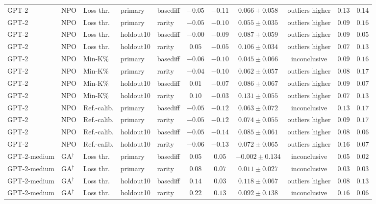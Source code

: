 \begin{table}[t]
\begin{tabular*}{\textwidth}{@{\extracolsep{\fill}}lllllcccccc@{}}
GPT-2 & NPO & Loss thr. & primary & basediff & $-0.05$ & $-0.11$ & $0.066 \pm 0.058$ & outliers higher & $0.13$ & $0.14$ \\
GPT-2 & NPO & Loss thr. & primary & rarity & $-0.05$ & $-0.10$ & $0.055 \pm 0.035$ & outliers higher & $0.09$ & $0.16$ \\
GPT-2 & NPO & Loss thr. & holdout10 & basediff & $-0.00$ & $-0.09$ & $0.087 \pm 0.059$ & outliers higher & $0.09$ & $0.05$ \\
GPT-2 & NPO & Loss thr. & holdout10 & rarity & $0.05$ & $-0.05$ & $0.106 \pm 0.034$ & outliers higher & $0.07$ & $0.13$ \\
GPT-2 & NPO & Min-K\% & primary & basediff & $-0.06$ & $-0.10$ & $0.045 \pm 0.066$ & inconclusive & $0.09$ & $0.16$ \\
GPT-2 & NPO & Min-K\% & primary & rarity & $-0.04$ & $-0.10$ & $0.062 \pm 0.057$ & outliers higher & $0.08$ & $0.17$ \\
GPT-2 & NPO & Min-K\% & holdout10 & basediff & $0.01$ & $-0.07$ & $0.086 \pm 0.067$ & outliers higher & $0.09$ & $0.07$ \\
GPT-2 & NPO & Min-K\% & holdout10 & rarity & $0.10$ & $-0.03$ & $0.131 \pm 0.055$ & outliers higher & $0.07$ & $0.13$ \\
GPT-2 & NPO & Ref.-calib. & primary & basediff & $-0.05$ & $-0.12$ & $0.063 \pm 0.072$ & inconclusive & $0.13$ & $0.17$ \\
GPT-2 & NPO & Ref.-calib. & primary & rarity & $-0.05$ & $-0.12$ & $0.074 \pm 0.055$ & outliers higher & $0.09$ & $0.17$ \\
GPT-2 & NPO & Ref.-calib. & holdout10 & basediff & $-0.05$ & $-0.14$ & $0.085 \pm 0.061$ & outliers higher & $0.08$ & $0.06$ \\
GPT-2 & NPO & Ref.-calib. & holdout10 & rarity & $-0.06$ & $-0.13$ & $0.072 \pm 0.065$ & outliers higher & $0.16$ & $0.07$ \\
GPT-2-medium & GA$^{\dagger}$ & Loss thr. & primary & basediff & $0.05$ & $0.05$ & $-0.002 \pm 0.134$ & inconclusive & $0.05$ & $0.02$ \\
GPT-2-medium & GA$^{\dagger}$ & Loss thr. & primary & rarity & $0.08$ & $0.07$ & $0.011 \pm 0.027$ & inconclusive & $0.03$ & $0.03$ \\
GPT-2-medium & GA$^{\dagger}$ & Loss thr. & holdout10 & basediff & $0.14$ & $0.03$ & $0.118 \pm 0.067$ & outliers higher & $0.08$ & $0.13$ \\
GPT-2-medium & GA$^{\dagger}$ & Loss thr. & holdout10 & rarity & $0.22$ & $0.13$ & $0.092 \pm 0.138$ & inconclusive & $0.16$ & $0.06$ \\

\end{tabular*}
\end{table}
